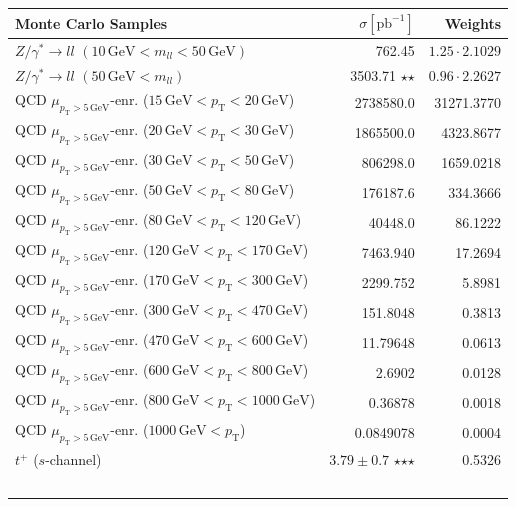 \begin{table}[htbp!]
  \centering
  \begin{tabular}{|l|r|r|}
\hline
Monte Carlo Samples & $\sigma [\text{pb}^{-1}]$ & Weights \\
\hline
\hline
$Z/\gamma^* \rightarrow ll$ $(10\,\text{GeV} < m_{ll} < 50\,\text{GeV})$ & 762.45 & $1.25 \cdot 2.1029$ \\
$Z/\gamma^* \rightarrow ll$ $(50\,\text{GeV} < m_{ll})$ & 3503.71 $\star$$\star$ & $0.96 \cdot 2.2627$ \\
\hline
QCD $\mu_{p_\text{T} > 5\,\text{GeV}}$-enr. ($15\,\text{GeV} < p_{\text{T}} < 20\,\text{GeV}$) & 2738580.0 & 31271.3770 \\
QCD $\mu_{p_\text{T} > 5\,\text{GeV}}$-enr. ($20\,\text{GeV} < p_{\text{T}} < 30\,\text{GeV}$) & 1865500.0 & 4323.8677 \\
QCD $\mu_{p_\text{T} > 5\,\text{GeV}}$-enr. ($30\,\text{GeV} < p_{\text{T}} < 50\,\text{GeV}$) & 806298.0 & 1659.0218 \\
QCD $\mu_{p_\text{T} > 5\,\text{GeV}}$-enr. ($50\,\text{GeV} < p_{\text{T}} < 80\,\text{GeV}$) & 176187.6 & 334.3666 \\
QCD $\mu_{p_\text{T} > 5\,\text{GeV}}$-enr. ($80\,\text{GeV} < p_{\text{T}} < 120\,\text{GeV}$) & 40448.0 & 86.1222 \\
QCD $\mu_{p_\text{T} > 5\,\text{GeV}}$-enr. ($120\,\text{GeV} < p_{\text{T}} < 170\,\text{GeV}$) & 7463.940 & 17.2694 \\
QCD $\mu_{p_\text{T} > 5\,\text{GeV}}$-enr. ($170\,\text{GeV} < p_{\text{T}} < 300\,\text{GeV}$) & 2299.752 & 5.8981 \\
QCD $\mu_{p_\text{T} > 5\,\text{GeV}}$-enr. ($300\,\text{GeV} < p_{\text{T}} < 470\,\text{GeV}$) & 151.8048 & 0.3813 \\
QCD $\mu_{p_\text{T} > 5\,\text{GeV}}$-enr. ($470\,\text{GeV} < p_{\text{T}} < 600\,\text{GeV}$) & 11.79648 & 0.0613 \\
QCD $\mu_{p_\text{T} > 5\,\text{GeV}}$-enr. ($600\,\text{GeV} < p_{\text{T}} < 800\,\text{GeV}$) & 2.6902 & 0.0128 \\
QCD $\mu_{p_\text{T} > 5\,\text{GeV}}$-enr. ($800\,\text{GeV} < p_{\text{T}} < 1000\,\text{GeV}$) & 0.36878 & 0.0018 \\
QCD $\mu_{p_\text{T} > 5\,\text{GeV}}$-enr. ($1000\,\text{GeV} < p_{\text{T}}$) & 0.0849078 & 0.0004 \\
\hline
$t^+$ ($s$-channel) & $3.79 \pm 0.7$ $\star$$\star$$\star$ \cite{topxsec} & 0.5326 \\
$$
\end{tabular}
\end{table}

